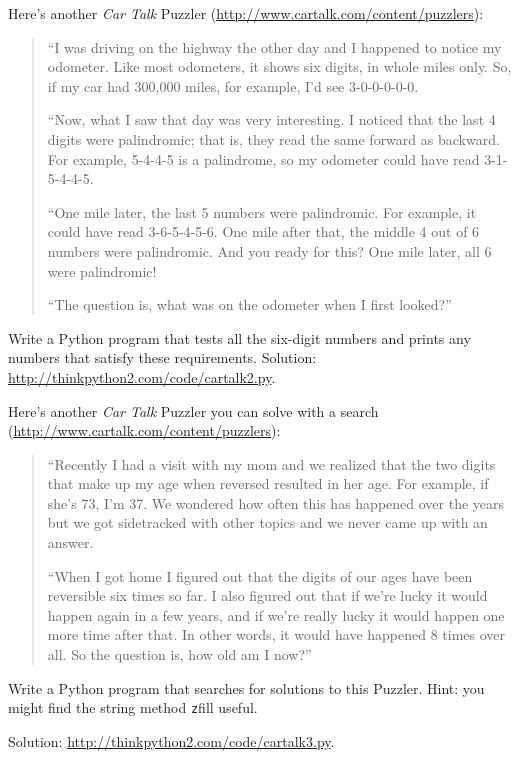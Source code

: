 \documentclass[
DIV=11,
fontsize=13,
twoside,
headinclude=false,
titlepage=firstiscover,
abstract=true,
headsepline=true,
footsepline=true,
chapterprefix=true, %
headings=big,
bibliography=totoc,%
captions=tableheading
]{scrbook}
\theoremstyle{definition}
\begin{document}
\begin{exercise}
\normalfont
Here's another {\em Car Talk}
Puzzler (\url{http://www.cartalk.com/content/puzzlers}):

\begin{quote}
``I was driving on the highway the other day and I happened to
notice my odometer. Like most odometers, it shows six digits,
in whole miles only. So, if my car had 300,000
miles, for example, I'd see 3-0-0-0-0-0.

``Now, what I saw that day was very interesting. I noticed that the
last 4 digits were palindromic; that is, they read the same forward as
backward. For example, 5-4-4-5 is a palindrome, so my odometer
could have read 3-1-5-4-4-5.

``One mile later, the last 5 numbers were palindromic. For example, it
could have read 3-6-5-4-5-6.  One mile after that, the middle 4 out of
6 numbers were palindromic.  And you ready for this? One mile later,
all 6 were palindromic!

``The question is, what was on the odometer when I first looked?''
\end{quote}

Write a Python program that tests all the six-digit numbers and prints
any numbers that satisfy these requirements.  
Solution: \url{http://thinkpython2.com/code/cartalk2.py}.

\end{exercise}


\begin{exercise}
\normalfont
Here's another {\em Car Talk} Puzzler you can solve with a
search (\url{http://www.cartalk.com/content/puzzlers}):

\begin{quote}
``Recently I had a visit with my mom and we realized that
the two digits that make up my age when reversed resulted in her
age. For example, if she's 73, I'm 37. We wondered how often this has
happened over the years but we got sidetracked with other topics and
we never came up with an answer.

``When I got home I figured out that the digits of our ages have been
reversible six times so far. I also figured out that if we're lucky it
would happen again in a few years, and if we're really lucky it would
happen one more time after that. In other words, it would have
happened 8 times over all. So the question is, how old am I now?''

\end{quote}

Write a Python program that searches for solutions to this Puzzler.
Hint: you might find the string method {\texttt zfill} useful.

Solution: \url{http://thinkpython2.com/code/cartalk3.py}.

\end{exercise}
\end{document}
